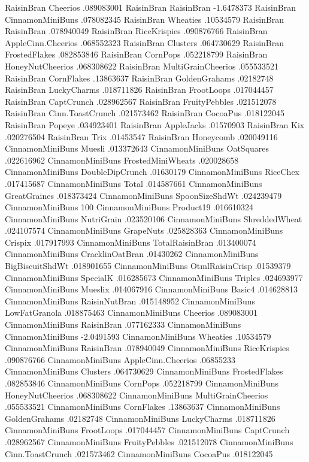RaisinBran	Cheerios	.089083001
RaisinBran	RaisinBran	-1.6478373
RaisinBran	CinnamonMiniBuns	.078082345
RaisinBran	Wheaties	.10534579
RaisinBran	RaisinBran	.078940049
RaisinBran	RiceKrispies	.090876766
RaisinBran	AppleCinn.Cheerios	.068552323
RaisinBran	Clusters	.064730629
RaisinBran	FrostedFlakes	.082853846
RaisinBran	CornPops	.052218799
RaisinBran	HoneyNutCheerios	.068308622
RaisinBran	MultiGrainCheerios	.055533521
RaisinBran	CornFlakes	.13863637
RaisinBran	GoldenGrahams	.02182748
RaisinBran	LuckyCharms	.018711826
RaisinBran	FrootLoops	.017044457
RaisinBran	CaptCrunch	.028962567
RaisinBran	FruityPebbles	.021512078
RaisinBran	Cinn.ToastCrunch	.021573462
RaisinBran	CocoaPus	.018122045
RaisinBran	Popeye	.034923401
RaisinBran	AppleJacks	.01570903
RaisinBran	Kix	.020276504
RaisinBran	Trix	.01453547
RaisinBran	Honeycomb	.020049116
CinnamonMiniBuns	Muesli	.013372643
CinnamonMiniBuns	OatSquares	.022616962
CinnamonMiniBuns	FrostedMiniWheats	.020028658
CinnamonMiniBuns	DoubleDipCrunch	.01630179
CinnamonMiniBuns	RiceChex	.017415687
CinnamonMiniBuns	Total	.014587661
CinnamonMiniBuns	GreatGraines	.018373424
CinnamonMiniBuns	SpoonSizeShdWt	.024239479
CinnamonMiniBuns	100%
CinnamonMiniBuns	Product19	.016610324
CinnamonMiniBuns	NutriGrain	.023520106
CinnamonMiniBuns	ShreddedWheat	.024107574
CinnamonMiniBuns	GrapeNuts	.025828363
CinnamonMiniBuns	Crispix	.017917993
CinnamonMiniBuns	TotalRaisinBran	.013400074
CinnamonMiniBuns	CracklinOatBran	.01430262
CinnamonMiniBuns	BigBiscuitShdWt	.018901655
CinnamonMiniBuns	OtmlRaisinCrisp	.01539379
CinnamonMiniBuns	SpecialK	.016285673
CinnamonMiniBuns	Triples	.024693977
CinnamonMiniBuns	Mueslix	.014067916
CinnamonMiniBuns	Basic4	.014628813
CinnamonMiniBuns	RaisinNutBran	.015148952
CinnamonMiniBuns	LowFatGranola	.018875463
CinnamonMiniBuns	Cheerios	.089083001
CinnamonMiniBuns	RaisinBran	.077162333
CinnamonMiniBuns	CinnamonMiniBuns	-2.0491593
CinnamonMiniBuns	Wheaties	.10534579
CinnamonMiniBuns	RaisinBran	.078940049
CinnamonMiniBuns	RiceKrispies	.090876766
CinnamonMiniBuns	AppleCinn.Cheerios	.06855233
CinnamonMiniBuns	Clusters	.064730629
CinnamonMiniBuns	FrostedFlakes	.082853846
CinnamonMiniBuns	CornPops	.052218799
CinnamonMiniBuns	HoneyNutCheerios	.068308622
CinnamonMiniBuns	MultiGrainCheerios	.055533521
CinnamonMiniBuns	CornFlakes	.13863637
CinnamonMiniBuns	GoldenGrahams	.02182748
CinnamonMiniBuns	LuckyCharms	.018711826
CinnamonMiniBuns	FrootLoops	.017044457
CinnamonMiniBuns	CaptCrunch	.028962567
CinnamonMiniBuns	FruityPebbles	.021512078
CinnamonMiniBuns	Cinn.ToastCrunch	.021573462
CinnamonMiniBuns	CocoaPus	.018122045
